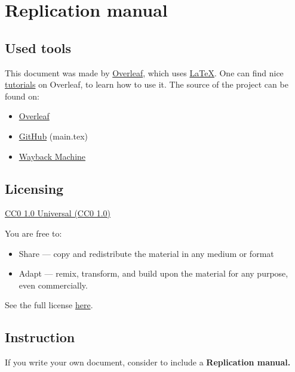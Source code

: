\documentclass{article}
\begin{document}
\section{Replication manual}

\subsection{Used tools}

This document was made by \href{https://www.overleaf.com/}{Overleaf}, which uses \href{https://en.wikipedia.org/wiki/LaTeX}{LaTeX}.
One can find nice \href{https://www.overleaf.com/learn/latex/Tutorials}{tutorials} on Overleaf, to learn how to use it. The source of the project can be found on:
\begin{itemize}
    \item \href{https://www.overleaf.com/read/vjhvckyttxxx}{Overleaf}
    \item \href{https://github.com/konczer/OpenCurriculum}{GitHub} (main.tex)
    \item \href{https://web.archive.org/web/*/https://github.com/konczer/OpenCurriculum/blob/main/main.tex}{Wayback Machine}
\end{itemize}

\subsection{Licensing}

\href{https://creativecommons.org/publicdomain/zero/1.0/}{CC0 1.0 Universal (CC0 1.0)}

You are free to:
\begin{itemize}
    \item Share — copy and redistribute the material in any medium or format
    \item Adapt — remix, transform, and build upon the material
    for any purpose, even commercially.
\end{itemize}

See the full license \href{https://creativecommons.org/publicdomain/zero/1.0/legalcode}{here}.

\subsection{Instruction}

If you write your own document, consider to include a \bf{Replication manual}.

\newpage

\tableofcontents \label{sec:toc}
\end{document}
